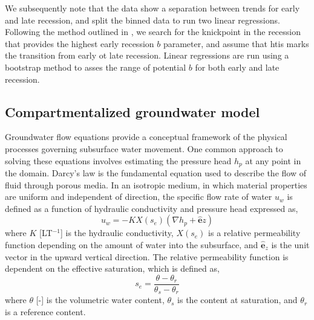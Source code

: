 \documentclass[hess, manuscript]{copernicus}
\begin{document}
We subsequently note that the data show a separation between trends for early and late recession, and split the binned data to run two linear regressions. Following the method outlined in \cite{tashie-etal-2020}, we search for the knickpoint in the recession that provides the highest early recession $b$ parameter, and assume that htis marks the transition from early ot late recession. Linear regressions are run using a bootstrap method to asses the range of potential $b$ for both early and late recession.

\subsection{Compartmentalized groundwater model}

Groundwater flow equations provide a conceptual framework of the physical processes governing subsurface water movement. One common approach to solving these equations involves estimating the pressure head $h_{p}$ at any point in the domain. Darcy’s law is the fundamental equation used to describe the flow of fluid through porous media. In an isotropic medium, in which material properties are uniform and independent of direction, the specific flow rate of water  $u_{w}$  is defined as a function of hydraulic conductivity and pressure head expressed as,
\begin{equation}
u_{w} = -KX(s_{e})\left(\nabla h_{p} + \hat{\mathbf{e}}{z}\right)
\end{equation}
where $K$ [LT$^{-1}$] is the hydraulic conductivity, $X(s_{e})$ is a relative permeability function depending on the amount of water into the subsurface, and $\hat{\mathbf{e}}_{z}$ is the unit vector in the upward vertical direction. The relative permeability function is dependent on the effective saturation, which is defined as,
\begin{equation}
s_{e} = \frac{\theta - \theta_{r}}{\theta_{s} - \theta_{r}}
\label{eq:se}
\end{equation}
where $\theta$ [-] is the volumetric water content, $\theta_{s}$ is the content at saturation, and $\theta_{r}$ is a reference content.
\end{document}
